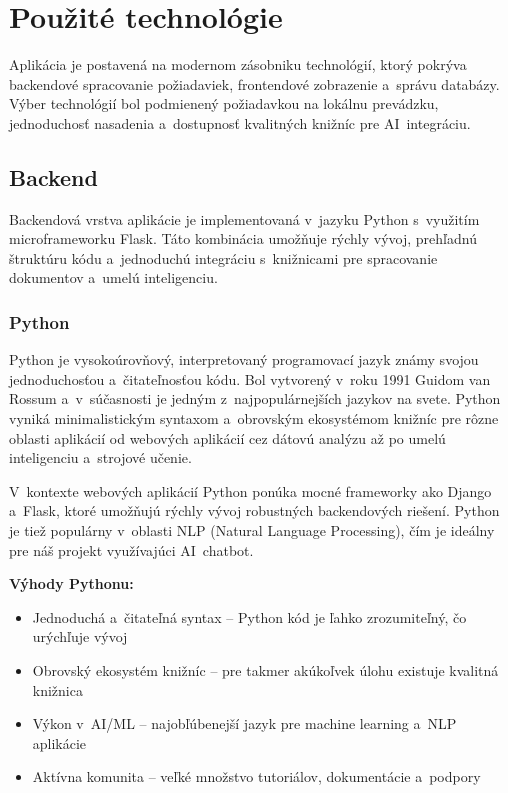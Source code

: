 \chapter{Použité technológie}

        Aplikácia je postavená na modernom zásobniku technológií, ktorý pokrýva backendové
spracovanie požiadaviek, frontendové zobrazenie a~správu databázy. Výber technológií bol
podmienený požiadavkou na lokálnu prevádzku, jednoduchosť nasadenia a~dostupnosť
kvalitných knižníc pre AI~integráciu.

\section{Backend}

        Backendová vrstva aplikácie je implementovaná v~jazyku Python s~využitím
microframeworku Flask. Táto kombinácia umožňuje rýchly vývoj, prehľadnú štruktúru kódu
a~jednoduchú integráciu s~knižnicami pre spracovanie dokumentov a~umelú inteligenciu.

\subsection{Python}

        Python je vysokoúrovňový, interpretovaný programovací jazyk známy svojou
jednoduchosťou a~čitateľnosťou kódu. Bol vytvorený v~roku 1991 Guidom van Rossum a~v~súčasnosti
je jedným z~najpopulárnejších jazykov na svete. Python vyniká minimalistickým syntaxom
a~obrovským ekosystémom knižníc pre rôzne oblasti aplikácií od webových aplikácií cez
dátovú analýzu až po umelú inteligenciu a~strojové učenie.

        V~kontexte webových aplikácií Python ponúka mocné frameworky ako Django a~Flask,
ktoré umožňujú rýchly vývoj robustných backendových riešení. Python je tiež populárny
v~oblasti NLP (Natural Language Processing), čím je ideálny pre náš projekt využívajúci
AI~chatbot.

        \textbf{Výhody Pythonu:}

\begin{itemize}
  \item Jednoduchá a~čitateľná syntax -- Python kód je ľahko zrozumiteľný, čo urýchľuje vývoj
  \item Obrovský ekosystém knižníc -- pre takmer akúkoľvek úlohu existuje kvalitná knižnica
  \item Výkon v~AI/ML -- najobľúbenejší jazyk pre machine learning a~NLP aplikácie
  \item Aktívna komunita -- veľké množstvo tutoriálov, dokumentácie a~podpory
\end{itemize}

